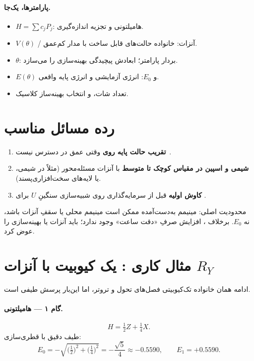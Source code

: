 \paragraph{پارامترها، یک‌جا.}
\begin{itemize}
	\item $H=\sum c_j P_j$: هامیلتونی و تجزیه اندازه‌گیری.
	\item $V(\theta)$ / آنزات: خانواده حالت‌های قابل ساخت با مدار کم‌عمق.
	\item $\theta$: بردار پارامتر؛ ابعادش پیچیدگی بهینه‌سازی را می‌سازد.
	\item $E(\theta)$ و $E_0$: انرژی آزمایشی و انرژی پایه واقعی.
	\item تعداد شات، و انتخاب بهینه‌ساز کلاسیک.
\end{itemize}

\section{رده مسائل مناسب }

\begin{enumerate}
	\item \textbf{تقریب حالت پایه روی } وقتی عمق  در دسترس نیست~\cite{Peruzzo2014,Tilly2022}.
	\item \textbf{شیمی و اسپین در مقیاس کوچک تا متوسط} با آنزات مسئله‌محور (مثلاً  در شیمی، یا لایه‌های سخت‌افزاری‌پسند).
	\item \textbf{کاوش اولیه} قبل از سرمایه‌گذاری روی شبیه‌سازی سنگینِ $U$ برای .
\end{enumerate}
محدودیت اصلی: مینیمم به‌دست‌آمده ممکن است مینیمم محلی یا سقفِ آنزات باشد، نه $E_0$. برخلاف ، افزایش صرفِ «دقت ساعت» وجود ندارد؛ باید آنزات یا بهینه‌سازی را عوض کرد.

\section{مثال کاری : یک کیوبیت با آنزات $R_Y$}
\label{sec:vqe-example}

ادامه همان خانواده تک‌کیوبیتی فصل‌های تحول و تروتر، اما این‌بار پرسش طیفی است.

\paragraph{گام ۱ --- هامیلتونی.}
\begin{equation}
	H = \tfrac12 Z + \tfrac14 X.
\end{equation}
طیف دقیق با قطری‌سازی:
\begin{equation}
	E_0 = -\sqrt{\bigl(\tfrac12\bigr)^2+\bigl(\tfrac14\bigr)^2}
	= -\frac{\sqrt5}{4}
	\approx -0.5590,
	\qquad
	E_1=+0.5590.
\end{equation}

